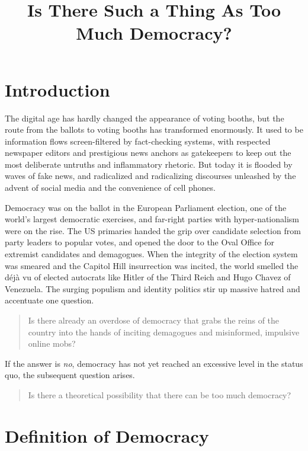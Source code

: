 \documentclass{scrartcl}
\theoremstyle{definition}
\begin{document}
\title{Is There Such a Thing As Too Much Democracy?}
\author{}
\date{}
\maketitle

\section{Introduction}

The digital age has hardly changed the appearance of voting booths, but the route from the ballots to voting booths has transformed enormously. It used to be information flows screen-filtered by fact-checking systems, with respected newspaper editors and prestigious news anchors as gatekeepers to keep out the most deliberate untruths and inflammatory rhetoric. But today it is flooded by waves of fake news, and radicalized and radicalizing discourses unleashed by the advent of social media and the convenience of cell phones. 

Democracy was on the ballot in the European Parliament election, one of the world’s largest democratic exercises, and far-right parties with hyper-nationalism were on the rise. The US primaries handed the grip over candidate selection from party leaders to popular votes, and opened the door to the Oval Office for extremist candidates and demagogues. When the integrity of the election system was smeared and the Capitol Hill insurrection was incited, the world smelled the déjà vu of elected autocrats like Hitler of the Third Reich and Hugo Chavez of Venezuela. The surging populism and identity politics stir up massive hatred and accentuate one question. 

\begin{quote}
Is there already an overdose of democracy that grabs the reins of the country into the hands of inciting demagogues and misinformed, impulsive online mobs? 
\end{quote}

If the answer is \emph{no}, democracy has not yet reached an excessive level in the status quo, the subsequent question arises.

\begin{quote}
Is there a theoretical possibility that there can be too much democracy? 
\end{quote}

\section{Definition of Democracy}
\end{document}

